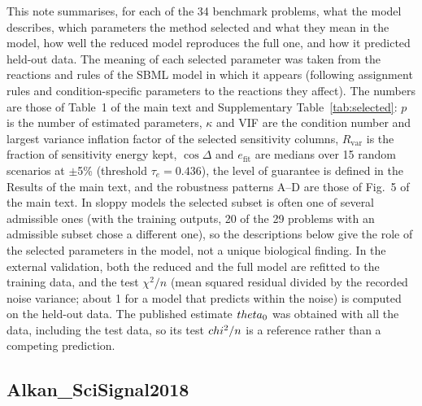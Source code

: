 
This note summarises, for each of the 34 benchmark problems, what the model describes, which parameters the method selected and what they mean in the model, how well the reduced model reproduces the full one, and how it predicted held-out data. The meaning of each selected parameter was taken from the reactions and rules of the SBML model in which it appears (following assignment rules and condition-specific parameters to the reactions they affect). The numbers are those of Table~1 of the main text and Supplementary Table~\ref{tab:selected}: $p$ is the number of estimated parameters, $\kappa$ and VIF are the condition number and largest variance inflation factor of the selected sensitivity columns, $R_{\mathrm{var}}$ is the fraction of sensitivity energy kept, $\cos\Delta$ and $e_{\mathrm{fit}}$ are medians over 15 random scenarios at $\pm$5\% (threshold $\tau_e=0.436$), the level of guarantee is defined in the Results of the main text, and the robustness patterns A--D are those of Fig.~5 of the main text. In sloppy models the selected subset is often one of several admissible ones (with the training outputs, 20 of the 29 problems with an admissible subset chose a different one), so the descriptions below give the role of the selected parameters in the model, not a unique biological finding. In the external validation, both the reduced and the full model are refitted to the training data, and the test $\chi^2/n$ (mean squared residual divided by the recorded noise variance; about 1 for a model that predicts within the noise) is computed on the held-out data. The published estimate $\\theta_0$ was obtained with all the data, including the test data, so its test $\\chi^2/n$ is a reference rather than a competing prediction.

\subsection*{Alkan\_SciSignal2018}

